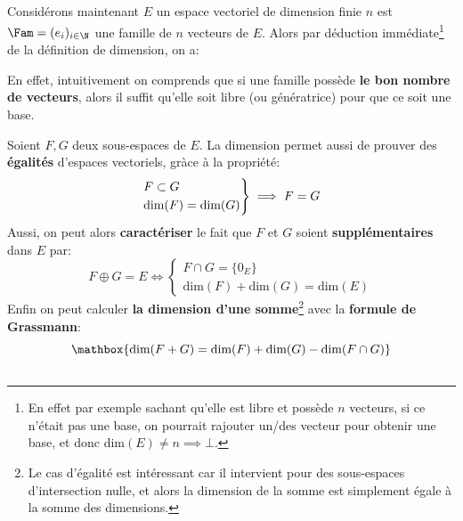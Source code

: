 \subsection*{}

Considérons maintenant \(E\) un espace vectoriel de dimension finie \(n\) est \(\Fam = (e_i)_{i \in \N}\) une famille de \(n\) vecteurs de \(E\).\+
Alors par déduction immédiate\footnote[2]{En effet par exemple sachant qu'elle est libre et possède \(n\) vecteurs, si ce n'était pas une base, on pourrait rajouter un/des vecteur pour obtenir une base, et donc dim\((E) \neq n \implies \bot\).} de la définition de dimension, on a:
\begin{center}
\end{center}
En effet, intuitivement on comprends que si une famille possède \textbf{le bon nombre de vecteurs}, alors il suffit qu'elle soit libre (ou génératrice) pour que ce soit une base.\<

Soient \(F, G\) deux sous-espaces de \(E\). La dimension permet aussi de prouver des \textbf{égalités} d'espaces vectoriels, gràce à la propriété:
\[
   \begin{rcases}
      F \subset G \\
      \text{dim}(F) = \text{dim}(G)
   \end{rcases}\implies F = G
\]
Aussi, on peut alors \textbf{caractériser} le fait que \(F\) et \(G\) soient \textbf{supplémentaires} dans \(E\) par:
\[
   F \oplus G = E \Longleftrightarrow \begin{cases}
      F \cap G = \{0_E\}\\
      \text{dim}(F) + \text{dim}(G) = \text{dim}(E)
   \end{cases}
\]
Enfin on peut calculer \textbf{la dimension d'une somme}\footnote[1]{Le cas d'égalité est intéressant car il intervient pour des sous-espaces d'intersection nulle, et alors la dimension de la somme est simplement égale à la somme des dimensions.} avec la \textbf{formule de Grassmann}:
\[
   \mathbox{\text{dim}(F + G) = \text{dim}(F) + \text{dim}(G) - \text{dim}(F \cap G)}   
\]

\subsection*{}

